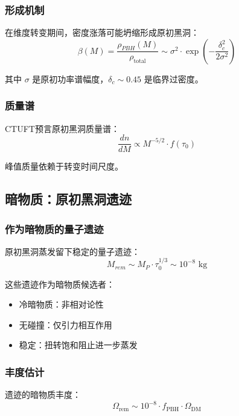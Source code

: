 \subsubsection{形成机制}

在维度转变期间，密度涨落可能坍缩形成原初黑洞：
\begin{equation}
    \beta(M) = \frac{\rho_{PBH}(M)}{\rho_{\text{total}}} \sim \sigma^2 \cdot \exp\left(-\frac{\delta_c^2}{2\sigma^2}\right)
\end{equation}

其中 $\sigma$ 是原初功率谱幅度，$\delta_c \sim 0.45$ 是临界过密度。

\subsubsection{质量谱}

CTUFT预言原初黑洞质量谱：
\begin{equation}
    \frac{dn}{dM} \propto M^{-5/2} \cdot f(\tau_0)
\end{equation}

峰值质量依赖于转变时间尺度。

\subsection{暗物质：原初黑洞遗迹}

\subsubsection{作为暗物质的量子遗迹}

原初黑洞蒸发留下稳定的量子遗迹：
\begin{equation}
    M_{rem} \sim M_P \cdot \tau_0^{1/3} \sim 10^{-8} \text{ kg}
\end{equation}

这些遗迹作为暗物质候选者：
\begin{itemize}
    \item 冷暗物质：非相对论性
    \item 无碰撞：仅引力相互作用
    \item 稳定：扭转饱和阻止进一步蒸发
\end{itemize}

\subsubsection{丰度估计}

遗迹的暗物质丰度：
\begin{equation}
    \Omega_{\text{rem}} \sim 10^{-8} \cdot f_{\text{PBH}} \cdot \Omega_{\text{DM}}
\end{equation}

